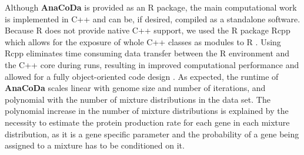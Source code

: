 \documentclass{bioinfo}
\newcommand{\package}{\textbf{AnaCoDa }} %
\begin{document}
Although \package is provided as an R package, the main computational work is implemented in C++ and can be, if desired, compiled as a standalone software.
Because R does not provide native C++ support, we used the R package Rcpp which allows for the exposure of whole C++ classes as modules to R \citep{rcpp_package}.
Using Rcpp eliminates time consuming data transfer between the R environment and the C++ core during runs, resulting in improved computational performance and allowed for a fully object-oriented code design \cite{ood_book}. 
As expected, the runtime of \package scales linear with genome size and number of iterations, and polynomial with the number of mixture distributions in the data set. The polynomial increase in the number of mixture distributions is explained by the necessity to estimate the protein production rate for each gene in each mixture distribution, as it is a gene specific parameter and the probability of a gene being assigned to a mixture has to be conditioned on it.



\end{document}

